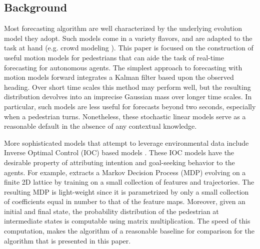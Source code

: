 \documentclass[letterpaper,10pt,conference]{ieeeconf}
\begin{document}

\subsection{Background}
Most forecasting algorithm are well characterized by the underlying evolution model they adopt.
Such models come in a variety flavors, and are adapted to the task at hand (e.g. crowd modeling \cite{Helbing1992}).
This paper is focused on the construction of useful motion models for pedestrians that can aide the task of real-time forecasting for autonomous agents.
The simplest approach to forecasting with motion models forward integrates a Kalman filter based upon the observed heading.
Over short time scales this method may perform well, but the resulting distribution devolves into an imprecise Gaussian mass over longer time scales.
In particular, such models are less useful for forecasts beyond two seconds, especially when a pedestrian turns.
Nonetheless, these stochastic linear models serve as a reasonable default in the absence of any contextual knowledge.

More sophisticated models that attempt to leverage environmental data include Inverse Optimal Control (IOC) based models \cite{Ziebart2008,Ziebart2009,Kitani2012,Xie2013,Karasev2016}.
These IOC models have the desirable property of attributing intention and goal-seeking behavior to the agents.
For example, \cite{Kitani2012} extracts a Markov Decision Process (MDP) evolving on a finite 2D lattice by training on a small collection of features and trajectories.
The resulting MDP is light-weight since it is parametrized by only a small collection of coefficients equal in number to that of the feature maps.
Moreover, given an initial and final state, the probability distribution of the pedestrian at intermediate states is computable using matrix multiplication.
The speed of this computation, makes the algorithm of \cite{Kitani2012} a reasonable baseline for comparison for the algorithm that is presented in this paper.
\end{document}
